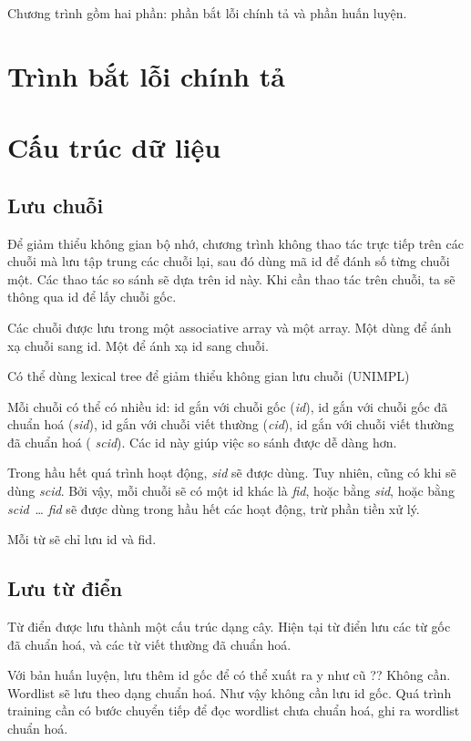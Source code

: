 \documentclass[a4paper,oneside,14pt]{extbook} %
\begin{document}
Chương trình gồm hai phần: phần bắt lỗi chính tả và phần huấn luyện.

\section{Trình bắt lỗi chính tả}



\section{Cấu trúc dữ liệu}


\subsection{Lưu chuỗi}

Để giảm thiểu không gian bộ nhớ, chương trình không thao tác trực tiếp
trên các chuỗi mà lưu tập trung các chuỗi lại, sau đó dùng mã id để
đánh số từng chuỗi một. Các thao tác so sánh sẽ dựa trên id này. Khi
cần thao tác trên chuỗi, ta sẽ thông qua id để lấy chuỗi gốc.

Các chuỗi được lưu trong một associative array và một array. Một dùng
để ánh xạ chuỗi sang id. Một để ánh xạ id sang chuỗi.

Có thể dùng lexical tree để giảm thiểu không gian lưu chuỗi (UNIMPL)

Mỗi chuỗi có thể có nhiều id: id gắn với chuỗi gốc ({\em id}), id gắn
với chuỗi gốc đã chuẩn hoá ({\em sid}), id gắn với chuỗi viết thường
({\em cid}), id  gắn với chuỗi viết thường đã chuẩn hoá ({\em
  scid}). Các id này giúp việc so sánh được dễ dàng hơn. 

Trong hầu hết quá trình hoạt động, {\em sid} sẽ được dùng. Tuy nhiên,
cũng có khi sẽ dùng {\em scid}. Bởi vậy, mỗi chuỗi sẽ có một id khác
là {\em fid}, hoặc bằng {\em sid}, hoặc bằng {\em scid}~\ldots{}{} {\em
  fid} sẽ được dùng trong hầu hết các hoạt động, trừ phần tiền xử lý.

Mỗi từ sẽ chỉ lưu id và fid.

\subsection{Lưu từ điển}

Từ điển được lưu thành một cấu trúc dạng cây. Hiện tại từ điển lưu các
từ gốc đã chuẩn hoá, và các từ viết thường đã chuẩn hoá.

Với bản huấn luyện, lưu thêm id gốc để có thể xuất ra y như cũ ??
Không cần. Wordlist sẽ lưu theo dạng chuẩn hoá. Như vậy không cần lưu
id gốc. Quá trình training cần có bước chuyển tiếp để đọc wordlist
chưa chuẩn hoá, ghi ra wordlist chuẩn hoá.
\end{document}
